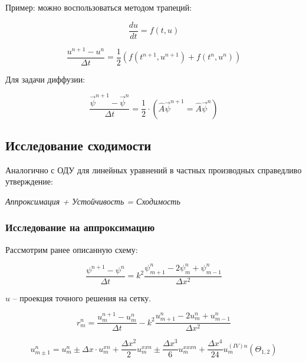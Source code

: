 \documentclass[10pt,a4paper]{article}
\begin{document}
		Пример: можно воспользоваться методом трапеций:
		
		\begin{equation}
			\frac{ du}{dt } = f\left(t, u\right)
		\end{equation}
		
		\begin{equation}
			\frac{u^{n + 1} - u^{n}}{\Delta t} = \frac{1}{2}\left(
			f\left(t^{n + 1}, u^{n + 1}\right) + f\left(t^{n}, u^{n}\right)
			\right)
		\end{equation}
		
		Для задачи диффузии:
		
		\begin{equation}
			\frac{\vec{\psi}^{n + 1} - \vec{\psi}^{n}}{\Delta t} = \frac{1}{2}
			\cdot \left(\hat{A}\vec{\psi}^{n + 1} =  \hat{A}\vec{\psi}^{n}
			\right)
		\end{equation}
		
	\subsection{Исследование сходимости}
	
		Аналогично с ОДУ для линейных уравнений в частных производных 
		справедливо утверждение:
		
		\textit{Аппроксимация + Устойчивость = Сходимость}
		
		\subsubsection{Исследование на аппроксимацию}
		
		Рассмотрим ранее описанную схему:
		
		\begin{equation}
			\frac{\psi^{n + 1} - \psi^{n}}{\Delta t} = k^{2}\frac{\psi_{m + 1}^
			{n} - 2\psi_{m}^{n} + \psi_{m - 1}^{n}}{\Delta x^{2}}
		\end{equation}
		
		$u$ -- проекция точного решения на сетку.
		
		\begin{equation}
			r_{m}^{n} = \frac{u^{n + 1}_{m} - u^{n}_{m}}{\Delta t} - k^{2}
			\frac{u^{n}_{m + 1} - 2u_{m}^{n} + u_{m - 1}^{n}}{\Delta x^{2}}
		\end{equation}
		
		\begin{equation}
			u^{n}_{m \pm 1} = u_{m}^{n} \pm \Delta x\cdot u^{xn}_{m} + \frac{\Delta x^{2}}{2}u^{xxn}_{m} \pm \frac{\Delta x^3}{6}u^{xxxn}_{m} + \frac{\Delta x^{4}}{24}u^{\left(IV\right)n}_{m}\left(\Theta_{1, 2}\right)
		\end{equation}
		
\end{document}
